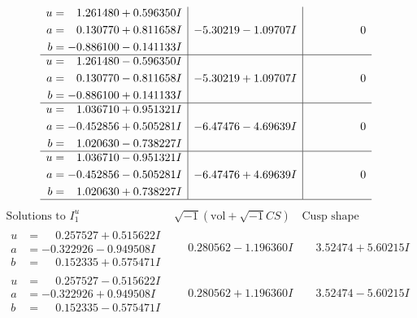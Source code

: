 \documentclass[1p]{elsarticle_modified}
\theoremstyle{definition}
\newcommand{\I}{\sqrt{-1}}
\begin{document}
$$\begin{array}{c|c|c}
\begin{aligned}
u &= \phantom{-}1.261480 + 0.596350 I \\
a &= \phantom{-}0.130770 + 0.811658 I \\
b &= -0.886100 - 0.141133 I\end{aligned}
 & -5.30219 - 1.09707 I & \phantom{-0.000000 } 0 \\ \hline\begin{aligned}
u &= \phantom{-}1.261480 - 0.596350 I \\
a &= \phantom{-}0.130770 - 0.811658 I \\
b &= -0.886100 + 0.141133 I\end{aligned}
 & -5.30219 + 1.09707 I & \phantom{-0.000000 } 0 \\ \hline\begin{aligned}
u &= \phantom{-}1.036710 + 0.951321 I \\
a &= -0.452856 + 0.505281 I \\
b &= \phantom{-}1.020630 - 0.738227 I\end{aligned}
 & -6.47476 - 4.69639 I & \phantom{-0.000000 } 0 \\ \hline\begin{aligned}
u &= \phantom{-}1.036710 - 0.951321 I \\
a &= -0.452856 - 0.505281 I \\
b &= \phantom{-}1.020630 + 0.738227 I\end{aligned}
 & -6.47476 + 4.69639 I & \phantom{-0.000000 } 0\\
 \hline 
 \end{array}$$\newpage$$\begin{array}{c|c|c}  
\text{Solutions to }I^u_{1}& \I (\text{vol} + \sqrt{-1}CS) & \text{Cusp shape}\\
 \hline 
\begin{aligned}
u &= \phantom{-}0.257527 + 0.515622 I \\
a &= -0.322926 - 0.949508 I \\
b &= \phantom{-}0.152335 + 0.575471 I\end{aligned}
 & \phantom{-}0.280562 - 1.196360 I & \phantom{-}3.52474 + 5.60215 I \\ \hline\begin{aligned}
u &= \phantom{-}0.257527 - 0.515622 I \\
a &= -0.322926 + 0.949508 I \\
b &= \phantom{-}0.152335 - 0.575471 I\end{aligned}
 & \phantom{-}0.280562 + 1.196360 I & \phantom{-}3.52474 - 5.60215 I \\ \hline\begin{aligned}

\end{aligned}
\end{array}$$
\end{document}
